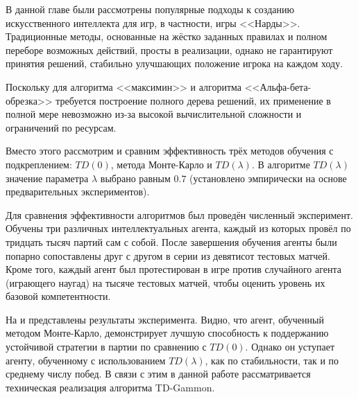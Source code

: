 В данной главе были рассмотрены популярные подходы к созданию искусственного интеллекта для игр, в частности, игры <<Нарды>>. Традиционные методы, основанные на жёстко заданных правилах и полном переборе возможных действий, просты в реализации, однако не гарантируют принятия решений, стабильно улучшающих положение игрока на каждом ходу.

Поскольку для алгоритма <<максимин>> и алгоритма <<Альфа-бета-обрезка>> требуется построение полного дерева решений, их применение в полной мере невозможно из-за высокой вычислительной сложности и ограничений по ресурсам.

Вместо этого рассмотрим и сравним эффективность трёх методов обучения с подкреплением: $TD(0)$, метода Монте-Карло и $TD(\lambda)$. В алгоритме $TD(\lambda)$ значение параметра $\lambda$ выбрано равным $0.7$ (установлено эмпирически на основе предварительных экспериментов).

Для сравнения эффективности алгоритмов был проведён численный эксперимент. Обучены три различных интеллектуальных агента, каждый из которых провёл по тридцать тысяч партий сам с собой. После завершения обучения агенты были попарно сопоставлены друг с другом в серии из девятисот тестовых матчей. Кроме того, каждый агент был протестирован в игре против случайного агента (играющего наугад) на тысяче тестовых матчей, чтобы оценить уровень их базовой компетентности.

На  и  представлены результаты эксперимента. Видно, что агент, обученный методом Монте-Карло, демонстрирует лучшую способность к поддержанию устойчивой стратегии в партии по сравнению с $TD(0)$. Однако он уступает агенту, обученному с использованием $TD(\lambda)$, как по стабильности, так и по среднему числу побед. В связи с этим в данной работе рассматривается техническая реализация алгоритма TD-Gammon.

